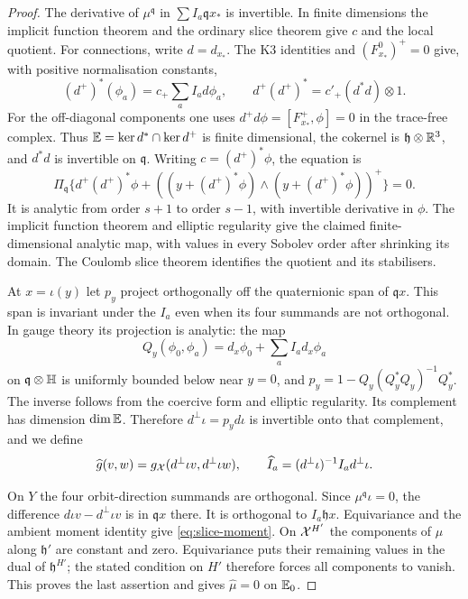 \begin{proof}
The derivative of $\mu^{\mathfrak q}$ in
$\sum I_a\mathfrak qx_*$ is invertible. In finite dimensions the
implicit function theorem and the ordinary slice theorem give
$c$ and the local quotient. For connections, write $d=d_{x_*}$.
The K3 identities and $(F_{x_*}^0)^+=0$ give, with positive
normalisation constants,
\begin{equation}\label{eq:K3-elliptic}
 (d^+)^*(\phi_a)=c_+\sum_a I_ad\phi_a,
 \qquad d^+(d^+)^*=c'_+(d^*d)\otimes1.
\end{equation}
For the off-diagonal components one uses
$d^+d\phi=[F_{x_*}^+,\phi]=0$ in the trace-free complex.
Thus $\mathbb E=\ker d^*\cap\ker d^+$ is finite dimensional,
the cokernel is $\mathfrak h\otimes\mathbb R^3$, and $d^*d$ is
invertible on $\mathfrak q$. Writing $c=(d^+)^*\phi$, the equation
is
\[
 \Pi_{\mathfrak q}\{d^+(d^+)^*\phi+
 ((y+(d^+)^*\phi)\wedge(y+(d^+)^*\phi))^+\}=0.
\]
It is analytic from order $s+1$ to order $s-1$, with invertible
derivative in $\phi$. The implicit function theorem and elliptic
regularity give the claimed finite-dimensional analytic map, with
values in every Sobolev order after shrinking its domain. The
Coulomb slice theorem \cite[Proposition~4.2.9]{dk90} identifies the
quotient and its stabilisers.

At $x=\iota(y)$ let $p_y$ project orthogonally off the
quaternionic span of $\mathfrak qx$. This span is invariant under
the $I_a$ even when its four summands are not orthogonal. In gauge
theory its projection is analytic: the map
\[
 Q_y(\phi_0,\phi_a)=d_x\phi_0+\sum_aI_ad_x\phi_a
\]
on $\mathfrak q\otimes\mathbb H$ is uniformly bounded below near
$y=0$, and
$p_y=1-Q_y(Q_y^*Q_y)^{-1}Q_y^*$. The inverse follows from the
coercive form and elliptic regularity. Its complement has dimension
$\dim\mathbb E$. Therefore $d^\perp\iota=p_y d\iota$ is invertible
onto that complement, and we define
\[
 \widehat g(v,w)=g_{\mathcal X}(d^\perp\iota v,d^\perp\iota w),
 \qquad \widehat I_a=(d^\perp\iota)^{-1}I_a d^\perp\iota.
\]

On $Y$ the four orbit-direction summands are orthogonal. Since
$\mu^{\mathfrak q}\iota=0$, the difference
$d\iota v-d^\perp\iota v$ is in $\mathfrak qx$ there. It is
orthogonal to $I_a\mathfrak hx$. Equivariance and the ambient
moment identity give \eqref{eq:slice-moment}.
On $\mathcal X^{H'}$ the components of $\mu$ along $\mathfrak h'$
are constant and zero. Equivariance puts their remaining values
in the dual of $\mathfrak h^{H'}$; the stated condition on $H'$
therefore forces all components to vanish. This proves the last
assertion and gives $\widehat\mu=0$ on $\mathbb E_0$.


\end{proof}
